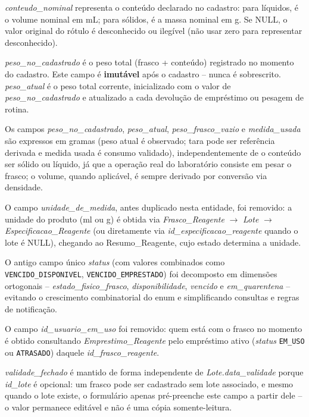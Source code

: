 \begin{explicacao}
\textit{conteudo\_nominal} representa o conteúdo declarado no cadastro: para líquidos, é o volume nominal em mL; para sólidos, é a massa nominal em g. Se NULL, o valor original do rótulo é desconhecido ou ilegível (não usar zero para representar desconhecido).

\textit{peso\_no\_cadastrado} é o peso total (frasco + conteúdo) registrado no momento do cadastro. Este campo é \textbf{imutável} após o cadastro -- nunca é sobrescrito. \textit{peso\_atual} é o peso total corrente, inicializado com o valor de \textit{peso\_no\_cadastrado} e atualizado a cada devolução de empréstimo ou pesagem de rotina.

Os campos \textit{peso\_no\_cadastrado}, \textit{peso\_atual}, \textit{peso\_frasco\_vazio} e \textit{medida\_usada} são expressos em gramas (peso atual é observado; tara pode ser referência derivada e medida usada é consumo validado), independentemente de o conteúdo ser sólido ou líquido, já que a operação real do laboratório consiste em pesar o frasco; o volume, quando aplicável, é sempre derivado por conversão via densidade.

O campo \textit{unidade\_de\_medida}, antes duplicado nesta entidade, foi removido: a unidade do produto (ml ou g) é obtida via \textit{Frasco\_Reagente} $\rightarrow$ \textit{Lote} $\rightarrow$ \textit{Especificacao\_Reagente} (ou diretamente via \textit{id\_especificacao\_reagente} quando o lote é NULL), chegando ao Resumo\_Reagente, cujo estado determina a unidade.

O antigo campo único \textit{status} (com valores combinados como \texttt{VENCIDO\_DISPONIVEL}, \texttt{VENCIDO\_EMPRESTADO}) foi decomposto em dimensões ortogonais -- \textit{estado\_fisico\_frasco}, \textit{disponibilidade}, \textit{vencido} e \textit{em\_quarentena} -- evitando o crescimento combinatorial do enum e simplificando consultas e regras de notificação.

O campo \textit{id\_usuario\_em\_uso} foi removido: quem está com o frasco no momento é obtido consultando \textit{Emprestimo\_Reagente} pelo empréstimo ativo (\textit{status} \texttt{EM\_USO} ou \texttt{ATRASADO}) daquele \textit{id\_frasco\_reagente}.

\textit{validade\_fechado} é mantido de forma independente de \textit{Lote.data\_validade} porque \textit{id\_lote} é opcional: um frasco pode ser cadastrado sem lote associado, e mesmo quando o lote existe, o formulário apenas pré-preenche este campo a partir dele -- o valor permanece editável e não é uma cópia somente-leitura.


\end{explicacao}
